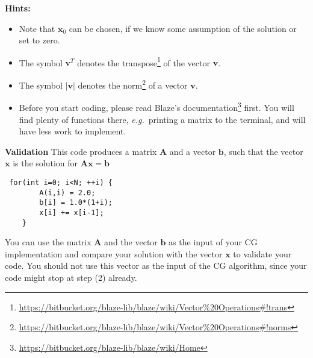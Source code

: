 \documentclass[11pt]{article}
\begin{document}
\begin{enumerate}
\textbf{Hints:}
\begin{itemize}
\item Note that $\mathbf{x}_0$ can be chosen, if we know some assumption of the solution or set to zero.
\item The symbol $\mathbf{v}^T$ denotes the transpose\footnote{\url{https://bitbucket.org/blaze-lib/blaze/wiki/Vector\%20Operations\#!trans}} of the vector $\mathbf{v}$.
\item  The symbol $\vert \mathbf{v} \vert$ denotes the norm\footnote{\url{https://bitbucket.org/blaze-lib/blaze/wiki/Vector\%20Operations\#!norms}} of a vector $\mathbf{v}$.
\item Before you start coding, please read Blaze's documentation\footnote{\url{https://bitbucket.org/blaze-lib/blaze/wiki/Home}} first. You will find plenty of functions there, \emph{e.g.}\ printing a matrix to the terminal, and will have less work to implement.
\end{itemize}

\textbf{Validation}
This code produces a matrix $\mathbf{A}$ and a vector $\mathbf{b}$, such that the vector $\mathbf{x}$ is the solution for  $\mathbf{A} \mathbf{x} = \mathbf{b}$
\begin{lstlisting}
 for(int i=0; i<N; ++i) {
        A(i,i) = 2.0;
        b[i] = 1.0*(1+i);
        x[i] += x[i-1];
    }
\end{lstlisting}
You can use the matrix $\mathbf{A}$ and the vector $\mathbf{b}$ as the input of your CG implementation and compare your solution with the vector $\mathbf{x}$ to validate your code. You should not use this vector as the input of the CG algorithm, since your code might stop at step (2) already.



\end{enumerate}
\doclicenseThis 
\end{document}
